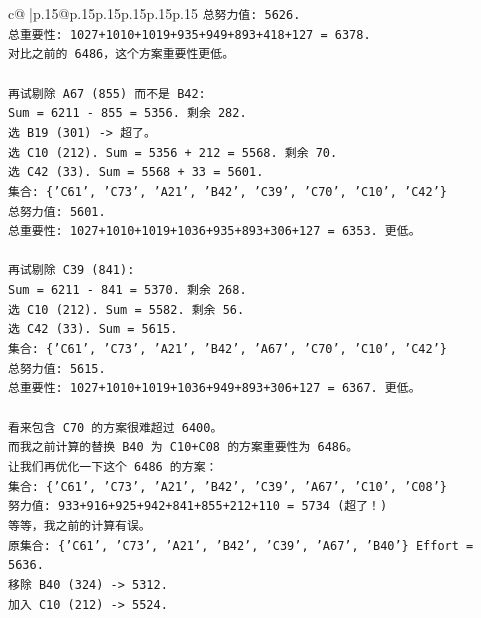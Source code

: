 \documentclass{article}
\begin{document}
{\begin{supertabular}{c@{$\;$}|p{.15\linewidth}@{}p{.15\linewidth}p{.15\linewidth}p{.15\linewidth}p{.15\linewidth}p{.15\linewidth}}
{{{\texttt{总努力值: 5626.} \\
\texttt{总重要性: 1027+1010+1019+935+949+893+418+127 = 6378.} \\
\texttt{对比之前的 6486，这个方案重要性更低。} \\
\\ 
\texttt{再试剔除 A67 (855) 而不是 B42:} \\
\texttt{Sum = 6211 {-} 855 = 5356. 剩余 282.} \\
\texttt{选 B19 (301) {-}> 超了。} \\
\texttt{选 C10 (212). Sum = 5356 + 212 = 5568. 剩余 70.} \\
\texttt{选 C42 (33). Sum = 5568 + 33 = 5601.} \\
\texttt{集合: \{'C61', 'C73', 'A21', 'B42', 'C39', 'C70', 'C10', 'C42'\}} \\
\texttt{总努力值: 5601.} \\
\texttt{总重要性: 1027+1010+1019+1036+935+893+306+127 = 6353. 更低。} \\
\\ 
\texttt{再试剔除 C39 (841):} \\
\texttt{Sum = 6211 {-} 841 = 5370. 剩余 268.} \\
\texttt{选 C10 (212). Sum = 5582. 剩余 56.} \\
\texttt{选 C42 (33). Sum = 5615.} \\
\texttt{集合: \{'C61', 'C73', 'A21', 'B42', 'A67', 'C70', 'C10', 'C42'\}} \\
\texttt{总努力值: 5615.} \\
\texttt{总重要性: 1027+1010+1019+1036+949+893+306+127 = 6367. 更低。} \\
\\ 
\texttt{看来包含 C70 的方案很难超过 6400。} \\
\texttt{而我之前计算的替换 B40 为 C10+C08 的方案重要性为 6486。} \\
\texttt{让我们再优化一下这个 6486 的方案：} \\
\texttt{集合: \{'C61', 'C73', 'A21', 'B42', 'C39', 'A67', 'C10', 'C08'\}} \\
\texttt{努力值: 933+916+925+942+841+855+212+110 = 5734 (超了！)} \\
\texttt{等等，我之前的计算有误。} \\
\texttt{原集合: \{'C61', 'C73', 'A21', 'B42', 'C39', 'A67', 'B40'\} Effort = 5636.} \\
\texttt{移除 B40 (324) {-}> 5312.} \\
\texttt{加入 C10 (212) {-}> 5524.} \\
}}}
\end{supertabular}}
\end{document}
